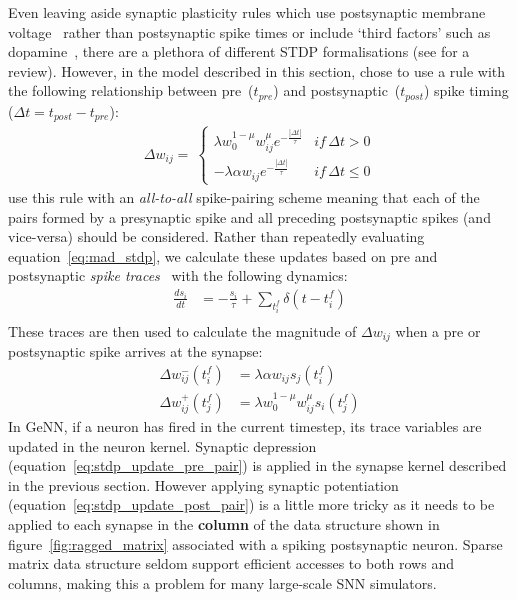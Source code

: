 \documentclass[utf8]{frontiersSCNS} %
\begin{document}
Even leaving aside synaptic plasticity rules which use postsynaptic membrane voltage~\citep{Brader2007,Clopath2010c} rather than postsynaptic spike times or include `third factors' such as dopamine~\citep{Izhikevich2007}, there are a plethora of different STDP formalisations (see \citet{Morrison2008} for a review).
However, in the model described in this section, \citet{Morrison2007} chose to use a rule with the following relationship between pre~($t_{pre}$) and postsynaptic~($t_{post}$) spike timing ($\Delta t = t_{post} - t_{pre}$):
%
\begin{align}
    \Delta w_{ij} = \
        \begin{cases}
            \lambda w_{0}^{1-\mu} w_{ij}^{\mu} e^{-\frac{|\Delta t|}{\tau}} & if\, \Delta t>0\\
            -\lambda \alpha w_{ij} e^{-\frac{|\Delta t|}{\tau}}             & if\, \Delta t\leq0
        \end{cases}\label{eq:mad_stdp}
\end{align}
%
\citet{Morrison2007} use this rule with an \textit{all-to-all} spike-pairing scheme meaning that each of the pairs formed by a presynaptic spike and all preceding postsynaptic spikes (and vice-versa) should be considered.
Rather than repeatedly evaluating equation~\ref{eq:mad_stdp}, we calculate these updates based on pre and postsynaptic \textit{spike traces}~\citep{Song2000, Morrison2007} with the following dynamics:
%
\begin{align}
    \frac{ds_{i}}{dt} & = -\frac{s_{i}}{\tau} + \sum_{t_{i}^{f}}\delta(t - t_{i}^{f}) \label{eq:stdp_trace}\\
\end{align}
%
These traces are then used to calculate the magnitude of $\Delta w_{ij}$ when a pre or postsynaptic spike arrives at the synapse:
%
\begin{align}
  \Delta w_{ij}^{-}(t_{i}^{f}) & = \lambda \alpha w_{ij} s_{j}(t_{i}^{f})\label{eq:stdp_update_pre_pair}\\
  \Delta w_{ij}^{+}(t_{j}^{f}) & = \lambda w_{0}^{1-\mu} w_{ij}^{\mu} s_{i}(t_{j}^{f})\label{eq:stdp_update_post_pair}
\end{align}
%
In GeNN, if a neuron has fired in the current timestep, its trace variables are updated in the neuron kernel.
Synaptic depression (equation~\ref{eq:stdp_update_pre_pair}) is applied in the synapse kernel described in the previous section.
However applying synaptic potentiation (equation~\ref{eq:stdp_update_post_pair}) is a little more tricky as it needs to be applied to each synapse in the \textbf{column} of the data structure shown in figure~\ref{fig:ragged_matrix} associated with a spiking postsynaptic neuron.
Sparse matrix data structure seldom support efficient accesses to both rows and columns, making this a problem for many large-scale SNN simulators.
\end{document}
